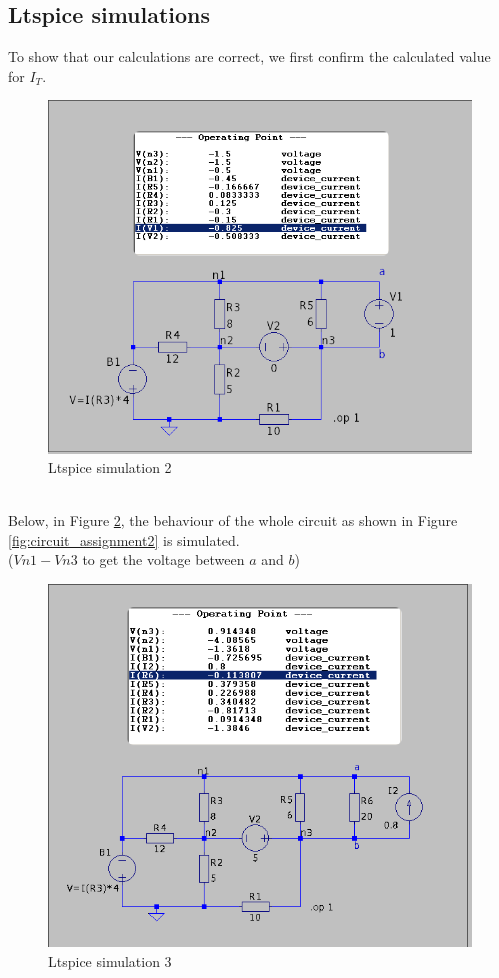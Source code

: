 \documentclass[a4paper]{article}
\begin{document}
\subsection{Ltspice simulations}
To show that our calculations are correct, we first confirm the calculated value for $I_{T}$. 
\begin{figure}[h!]\centering
   \includegraphics[scale=0.5]{./Figures/ltspice_testvoltage.png} 
\caption{Ltspice simulation 2}
\label{fig:ltspice_2}
\end{figure}
\\Below, in Figure \ref{fig:ltspice_3}, the behaviour of the whole circuit as shown in
Figure \ref{fig:circuit_assignment2} is simulated.\\ 
($V{n1} -V{n3}$ to get the voltage between $a$ and $b$) 
\begin{figure}[h!]\centering
   \includegraphics[scale=0.5]{./Figures/ltspice_all.png} 
\caption{Ltspice simulation 3}
\label{fig:ltspice_3}
\end{figure}
\end{document}
